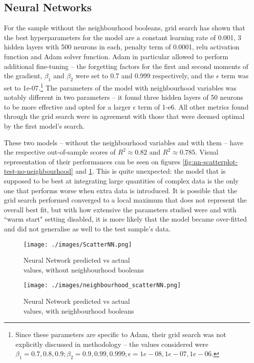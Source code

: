 \documentclass[12pt]{report}
\begin{document}
\subsection{Neural Networks}
For the sample without the neighbourhood booleans, grid search has shown that the best hyperparameters for the model are a constant learning rate of 0.001, 3 hidden layers with 500 neurons in each, penalty term of 0.0001, relu activation function and Adam solver function. Adam in particular allowed to perform additional fine-tuning -- the forgetting factors for the first and second moments of the gradient, $\beta_{1}$ and $\beta_{2}$ were set to 0.7 and 0.999 respectively, and the $\epsilon$ term was set to 1e-07.\footnote{Since these parameters are specific to Adam, their grid search was not explicitly discussed in methodology -- the values considered were $\beta_1=0.7, 0.8, 0.9; \beta_2=0.9, 0.99, 0.999; \epsilon=1e-08, 1e-07, 1e-06$.} The parameters of the model with neighbourhood variables was notably different in two parameters -- it found three hidden layers of 50 neurons to be more effective and opted for a larger $\epsilon$ term of 1-e6. All other metrics found through the grid search were in agreement with those that were deemed optimal by the first model's search.

These two models -- without the neighbourhood variables and with them -- have the respective out-of-sample scores of $R^2\approx0.82$ and $R^2\approx0.785$. Visual representation of their performances can be seen on figures \ref{fig:nn-scatterplot-test-no-neighbourhood} and \ref{fig:nn-scatterplot-test}. This is quite unexpected: the model that is supposed to be best at integrating large quantities of complex data is the only one that performs worse when extra data is introduced. It is possible that the grid search performed converged to a local maximum that does not represent the overall best fit, but with how extensive the parameters studied were and with ``warm start" setting disabled, it is more likely that the model became over-fitted and did not generalise as well to the test sample's data.


\begin{figure}
	\begin{minipage}[t]{0.47\textwidth}
		\centering
		\texttt{[image: ./images/ScatterNN.png]}
		\caption{Neural Network predicted vs actual \\ values, without neighbourhood booleans}
		\label{fig:nn-scatterplot-test-no-neighbourhood}
	\end{minipage}
	\begin{minipage}[t]{0.47\textwidth}
		\centering
		\texttt{[image: ./images/neighbourhood\_scatterNN.png]}
		\caption{Neural Network predicted vs actual \\ values, with neighbourhood booleans}
		\label{fig:nn-scatterplot-test}
	\end{minipage}
\end{figure}
\end{document}
